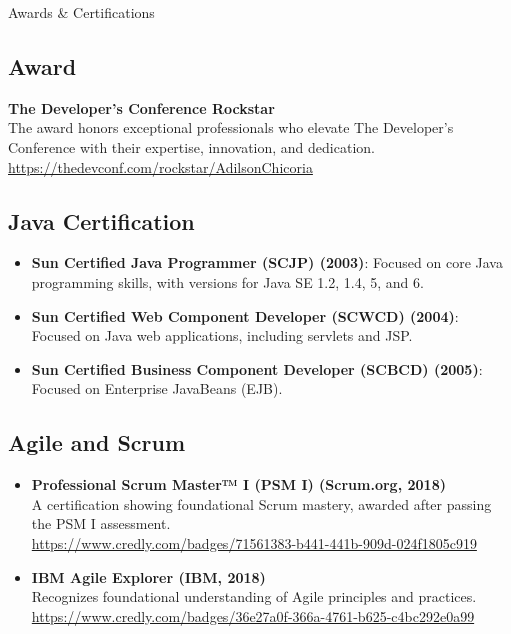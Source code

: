 \documentclass{resume} %
\begin{document}
\begin{rSection}{Awards \& Certifications} 

\subsection*{Award}

\textbf{The Developer's Conference Rockstar} \\
The award honors exceptional professionals who elevate The Developer's Conference with their expertise, innovation, and dedication. \\
\url{https://thedevconf.com/rockstar/AdilsonChicoria}

\subsection*{Java Certification}

\begin{itemize}
    \item \textbf{Sun Certified Java Programmer (SCJP) (2003)}: Focused on core Java programming skills, with versions for Java SE 1.2, 1.4, 5, and 6.
    \item \textbf{Sun Certified Web Component Developer (SCWCD) (2004)}: Focused on Java web applications, including servlets and JSP.
    \item \textbf{Sun Certified Business Component Developer (SCBCD) (2005)}: Focused on Enterprise JavaBeans (EJB).
\end{itemize}

\subsection*{Agile and Scrum}
\begin{itemize}
    \item \textbf{Professional Scrum Master™ I (PSM I) (Scrum.org, 2018)} \\
    A certification showing foundational Scrum mastery, awarded after passing the PSM I assessment. \\
    \url{https://www.credly.com/badges/71561383-b441-441b-909d-024f1805c919}
    
    \item \textbf{IBM Agile Explorer (IBM, 2018)} \\
    Recognizes foundational understanding of Agile principles and practices. \\
    \url{https://www.credly.com/badges/36e27a0f-366a-4761-b625-c4bc292e0a99}
\end{itemize}


\end{rSection}
\end{document}
